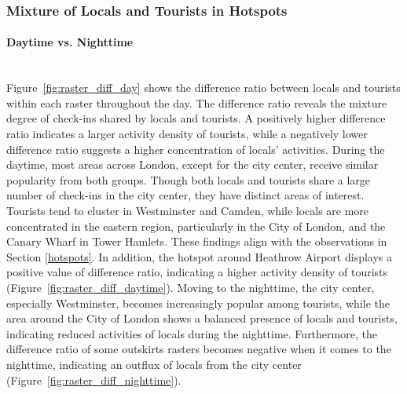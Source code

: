 \documentclass{article}
\newcommand{\subsubsubsection}[1]{\paragraph{#1}\mbox{}\\}
\theoremstyle{definition}
\theoremstyle{remark}
\begin{document}
\subsubsection{Mixture of Locals and Tourists in Hotspots}

\subsubsubsection{Daytime vs. Nighttime}
Figure~\ref{fig:raster_diff_day} shows the difference ratio between locals and tourists within each raster throughout the day. The difference ratio reveals the mixture degree of check-ins shared by locals and tourists. A positively higher difference ratio indicates a larger activity density of tourists, while a negatively lower difference ratio suggests a higher concentration of locals' activities. During the daytime, most areas across London, except for the city center, receive similar popularity from both groups. Though both locals and tourists share a large number of check-ins in the city center, they have distinct areas of interest. Tourists tend to cluster in Westminster and Camden, while locals are more concentrated in the eastern region, particularly in the City of London, and the Canary Wharf in Tower Hamlets. These findings align with the observations in Section \ref{hotspots}. In addition, the hotspot around Heathrow Airport displays a positive value of difference ratio, indicating a higher activity density of tourists (Figure~\ref{fig:raster_diff_daytime}). Moving to the nighttime, the city center, especially Westminster, becomes increasingly popular among tourists, while the area around the City of London shows a balanced presence of locals and tourists, indicating reduced activities of locals during the nighttime. Furthermore, the difference ratio of some outskirts rasters becomes negative when it comes to the nighttime, indicating an outflux of locals from the city center (Figure~\ref{fig:raster_diff_nighttime}).
\end{document}
